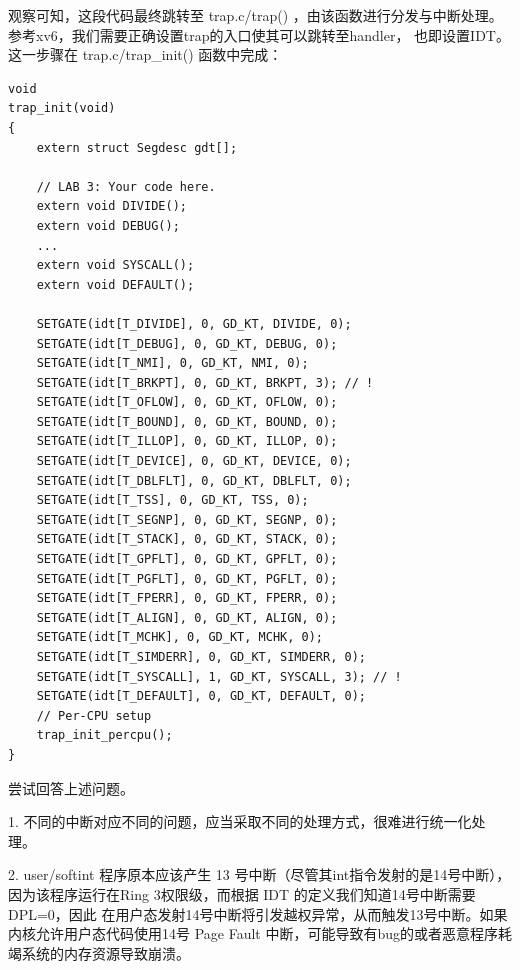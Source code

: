 \documentclass[12pt, letterpaper]{report}
\begin{document}
\newpage
观察可知，这段代码最终跳转至 trap.c/trap() ，由该函数进行分发与中断处理。
参考xv6，我们需要正确设置trap的入口使其可以跳转至handler，
也即设置IDT。这一步骤在 trap.c/trap\_init() 函数中完成：
\lstset{style=CStyle}
\setmainfont{Consolas}
\begin{lstlisting}
void
trap_init(void)
{
    extern struct Segdesc gdt[];

    // LAB 3: Your code here.
    extern void DIVIDE();
    extern void DEBUG();
    ...
    extern void SYSCALL();
    extern void DEFAULT();

    SETGATE(idt[T_DIVIDE], 0, GD_KT, DIVIDE, 0);
    SETGATE(idt[T_DEBUG], 0, GD_KT, DEBUG, 0);
    SETGATE(idt[T_NMI], 0, GD_KT, NMI, 0);
    SETGATE(idt[T_BRKPT], 0, GD_KT, BRKPT, 3); // !
    SETGATE(idt[T_OFLOW], 0, GD_KT, OFLOW, 0);
    SETGATE(idt[T_BOUND], 0, GD_KT, BOUND, 0);
    SETGATE(idt[T_ILLOP], 0, GD_KT, ILLOP, 0);
    SETGATE(idt[T_DEVICE], 0, GD_KT, DEVICE, 0);
    SETGATE(idt[T_DBLFLT], 0, GD_KT, DBLFLT, 0);
    SETGATE(idt[T_TSS], 0, GD_KT, TSS, 0);
    SETGATE(idt[T_SEGNP], 0, GD_KT, SEGNP, 0);
    SETGATE(idt[T_STACK], 0, GD_KT, STACK, 0);
    SETGATE(idt[T_GPFLT], 0, GD_KT, GPFLT, 0);
    SETGATE(idt[T_PGFLT], 0, GD_KT, PGFLT, 0);
    SETGATE(idt[T_FPERR], 0, GD_KT, FPERR, 0);
    SETGATE(idt[T_ALIGN], 0, GD_KT, ALIGN, 0);
    SETGATE(idt[T_MCHK], 0, GD_KT, MCHK, 0);
    SETGATE(idt[T_SIMDERR], 0, GD_KT, SIMDERR, 0);
    SETGATE(idt[T_SYSCALL], 1, GD_KT, SYSCALL, 3); // !
    SETGATE(idt[T_DEFAULT], 0, GD_KT, DEFAULT, 0);
    // Per-CPU setup 
    trap_init_percpu();
}
\end{lstlisting}
\setmainfont{Times New Roman}

\newpage 
{}
\quad \par 
尝试回答上述问题。\par 
1. 不同的中断对应不同的问题，应当采取不同的处理方式，很难进行统一化处理。\par 
2. user/softint 程序原本应该产生 13 号中断（尽管其int指令发射的是14号中断），
因为该程序运行在Ring 3权限级，而根据 IDT 的定义我们知道14号中断需要DPL=0，因此
在用户态发射14号中断将引发越权异常，从而触发13号中断。如果内核允许用户态代码使用14号
Page Fault 中断，可能导致有bug的或者恶意程序耗竭系统的内存资源导致崩溃。\par 
\end{document}
